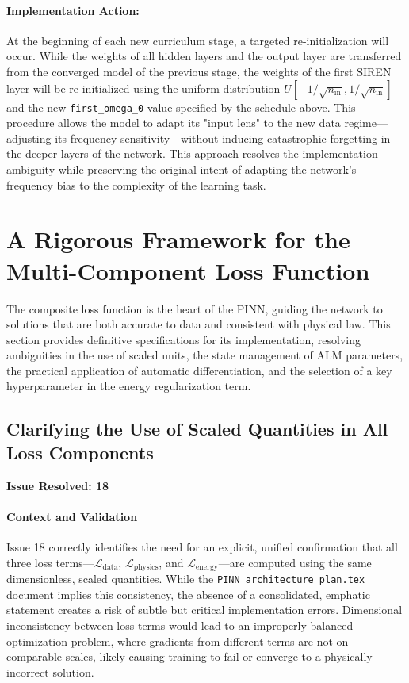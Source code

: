 \documentclass[11pt, a4paper]{article}
\begin{document}
\paragraph{Implementation Action:}
At the beginning of each new curriculum stage, a targeted re-initialization will occur. While the weights of all hidden layers and the output layer are transferred from the converged model of the previous stage, the weights of the first SIREN layer will be re-initialized using the uniform distribution $U[-1/\sqrt{n_{\text{in}}}, 1/\sqrt{n_{\text{in}}}]$ and the new \texttt{first\_omega\_0} value specified by the schedule above. This procedure allows the model to adapt its "input lens" to the new data regime—adjusting its frequency sensitivity—without inducing catastrophic forgetting in the deeper layers of the network. This approach resolves the implementation ambiguity while preserving the original intent of adapting the network's frequency bias to the complexity of the learning task.

\section{A Rigorous Framework for the Multi-Component Loss Function}
The composite loss function is the heart of the PINN, guiding the network to solutions that are both accurate to data and consistent with physical law. This section provides definitive specifications for its implementation, resolving ambiguities in the use of scaled units, the state management of ALM parameters, the practical application of automatic differentiation, and the selection of a key hyperparameter in the energy regularization term.

\subsection{Clarifying the Use of Scaled Quantities in All Loss Components}
\textbf{Issue Resolved: 18}
\paragraph{Context and Validation}
Issue 18 correctly identifies the need for an explicit, unified confirmation that all three loss terms—$\mathcal{L}_{\text{data}}$, $\mathcal{L}_{\text{physics}}$, and $\mathcal{L}_{\text{energy}}$—are computed using the same dimensionless, scaled quantities. While the \texttt{PINN\_architecture\_plan.tex} document implies this consistency, the absence of a consolidated, emphatic statement creates a risk of subtle but critical implementation errors. Dimensional inconsistency between loss terms would lead to an improperly balanced optimization problem, where gradients from different terms are not on comparable scales, likely causing training to fail or converge to a physically incorrect solution.
\end{document}
